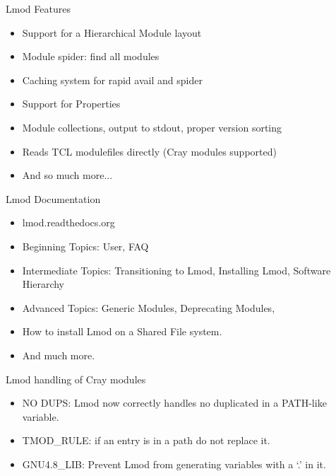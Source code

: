\documentclass{beamer}
\begin{document}
\begin{frame}{Lmod Features}
  \begin{itemize}
    \item Support for a Hierarchical Module layout
    \item Module spider: find all modules
    \item Caching system for rapid avail and spider
    \item Support for Properties
    \item Module collections, output to stdout, proper version sorting
    \item Reads TCL modulefiles directly (Cray modules supported)
    \item And so much more...
  \end{itemize}
\end{frame}

\begin{frame}{Lmod Documentation}
  \begin{itemize}
    \item lmod.readthedocs.org
    \item Beginning Topics: User, FAQ
    \item Intermediate Topics: Transitioning to Lmod, Installing Lmod,
      Software Hierarchy
    \item Advanced Topics: Generic Modules, Deprecating Modules, 
    \item How to install Lmod on a Shared File system.
    \item And much more.
  \end{itemize}
\end{frame}

\begin{frame}{Lmod handling of Cray modules}
  \begin{itemize}
    \item NO DUPS: Lmod now correctly handles no duplicated in a
      PATH-like variable.
    \item TMOD\_RULE: if an entry is in a path do not replace it.
    \item GNU4.8\_LIB: Prevent Lmod from generating variables with a
      `.' in it.
  \end{itemize}
\end{frame}
\end{document}

